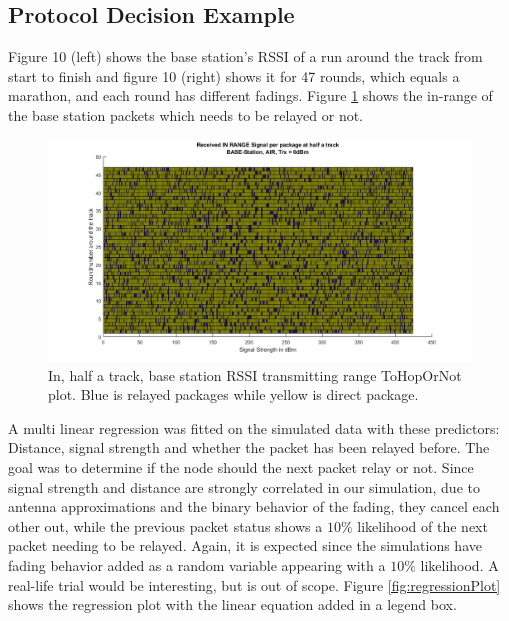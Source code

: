 \subsection{Protocol Decision Example}\label{sc:protocolDecisionExample}
Figure 10 (left) shows the base station's RSSI of a run around the track from start to finish and figure 10 (right) shows it for 47 rounds, which equals a marathon, and each round has different fadings. Figure \ref{fig:recievedSignal_inRange_halfTrack} shows the in-range of the base station packets which needs to be relayed or not.


\begin{figure}[H]
	\centering
	\includegraphics[width=\linewidth]{theory/protocolDecisionExample/fig/recievedSignal_inRange_halfTrack.png}
	\caption{In, half a track, base station RSSI transmitting range ToHopOrNot plot. Blue is relayed packages while yellow is direct package.}
	\label{fig:recievedSignal_inRange_halfTrack}
\end{figure}

A multi linear regression was fitted on the simulated data with these predictors: Distance, signal strength and whether the packet has been relayed before. The goal was to determine if the node should the next packet relay or not. Since signal strength and distance are strongly correlated in our simulation, due to antenna approximations and the binary behavior of the fading, they cancel each other out, while the previous packet status shows a $10\%$ likelihood of the next packet needing to be relayed. Again, it is expected since the simulations have fading behavior added as a random variable appearing with a $10\%$ likelihood. A real-life trial would be interesting, but is out of scope. Figure \ref{fig:regressionPlot} shows the regression plot with the linear equation added in a legend box.

